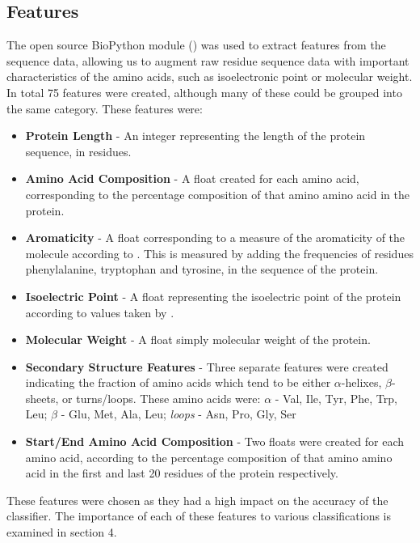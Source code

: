\documentclass{bioinfo}
\begin{document}
\subsection{Features}

The open source BioPython module (\cite{Biopython}) was used to extract features from the sequence data, allowing us to augment raw residue sequence data with important characteristics of the amino acids, such as isoelectronic point or molecular weight. 
In total 75 features were created, although many of these could be grouped into the same category. These features were:

\begin{itemize}


\item{ \textbf{Protein Length} } - An integer representing the length of the protein sequence, in residues.
\item{ \textbf{Amino Acid Composition} } - A float created for each amino acid, corresponding to the percentage composition of that amino amino acid in the protein.
\item{ \textbf{Aromaticity}} - A float corresponding to a measure of the aromaticity of the molecule according to \cite{Lobry}. This is measured by adding the frequencies of residues phenylalanine, tryptophan and tyrosine, in the sequence of the protein.
\item{ \textbf{Isoelectric Point}} - A float representing the isoelectric point of the protein according to values taken by \cite{Bjellqvist}.
\item{ \textbf{Molecular Weight}} - A float simply molecular weight of the protein. 
\item{ \textbf{Secondary Structure Features}} - Three separate features were created indicating the fraction of amino acids which tend to be either $\alpha$-helixes, $\beta$-sheets, or turns/loops. These amino acids were: $\alpha$ - Val, Ile, Tyr, Phe, Trp, Leu;   $\beta$ - Glu, Met, Ala, Leu; \textit{loops} -  Asn, Pro, Gly, Ser
\item{ \textbf{Start/End Amino Acid Composition} - Two floats were created for each amino acid, according to the percentage composition of that amino amino acid in the first and last 20 residues of the protein respectively.}

\end{itemize}

These features were chosen as they had a high impact on the accuracy of the classifier. 
The importance of each of these features to various classifications is examined in section 4.  
\end{document}
